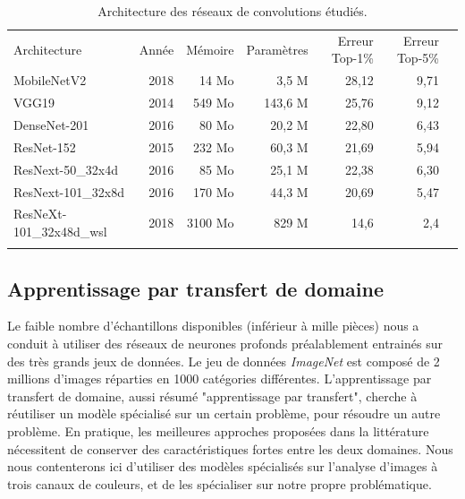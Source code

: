 \begin{table}[hbtp]
	\centering
	\begin{tabular}{|l|r|r|r|r|r|r|}
		\hhline{------}
		Architecture             & Année & Mémoire & Paramètres & Erreur Top-1\% & Erreur Top-5\% \\
		\hhline{=:=:=:=:=:=} %
		MobileNetV2              & 2018  & 14 Mo   & 3,5 M      & 28,12          & 9,71           \\ \hline
		VGG19                    & 2014  & 549 Mo  & 143,6 M    & 25,76          & 9,12           \\ \hline
		DenseNet-201             & 2016  & 80 Mo   & 20,2 M     & 22,80          & 6,43           \\ \hline
		ResNet-152               & 2015  & 232 Mo  & 60,3 M     & 21,69          & 5,94           \\ \hline
		ResNext-50\_32x4d        & 2016  & 85 Mo   & 25,1 M     & 22,38          & 6,30           \\ \hline
		ResNext-101\_32x8d       & 2016  & 170 Mo  & 44,3 M     & 20,69          & 5,47          \\ \hline
		ResNeXt-101\_32x48d\_wsl & 2018  & 3100 Mo & 829 M      & 14,6           &     2,4           \\
		\hhline{------}
	\end{tabular}
	\caption{Architecture des réseaux de convolutions étudiés.}
	\label{tab:deep_models}
\end{table}


\subsection{Apprentissage par transfert de domaine} \label{subsec:transfer_learning}

Le faible nombre d'échantillons disponibles (inférieur à mille pièces) nous a conduit à utiliser des réseaux de neurones profonds préalablement entrainés sur des très grands jeux de données.
Le jeu de données \textit{ImageNet} \cite{deng_imagenet_2009} est composé de 2 millions d'images réparties en 1000 catégories différentes.
L'apprentissage par transfert de domaine, aussi résumé "apprentissage par transfert", cherche à réutiliser un modèle spécialisé sur un certain problème, pour résoudre un autre problème.
En pratique, les meilleures approches proposées dans la littérature nécessitent de conserver des caractéristiques fortes entre les deux domaines.
Nous nous contenterons ici d'utiliser des modèles spécialisés sur l'analyse d'images à trois canaux de couleurs, et de les spécialiser sur notre propre problématique.


